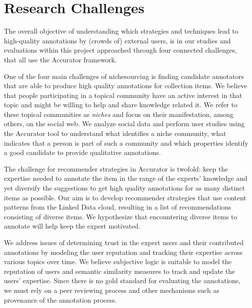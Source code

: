 \section{Research Challenges}
\label{use_case}

The overall objective of understanding which strategies and techniques lead to high-quality annotations by (crowds of) external users, is in our studies and evaluations within this project approached through four connected challenges, that all use the Accurator framework.

One of the four main challenges of nichesourcing is finding candidate annotators that are able to produce high quality annotations for collection items. 
We believe that people participating in a topical community have an active interest in that topic and might be willing to help and share knowledge related it. We refer to these topical communities as \textit{niches} and focus on their manifestation, among others, on the social web. We analyze social data and perform user studies using the Accurator tool to understand what identifies a niche community, what indicates that a person is part of such a community and which properties identify a good candidate to provide qualitative annotations. 

The challenge for recommender strategies in Accurator is twofold: keep the expertise needed to annotate the item in the range of the experts' knowledge and yet diversify the suggestions to get high quality annotations for as many distinct items as possible. 
Our aim is to develop recommender strategies that use content patterns from the Linked Data cloud, resulting in a list of recommendations consisting of diverse items. 
We hypothesize that encountering diverse items to annotate will help keep the expert motivated.

We address issues of determining trust in the expert users and their contributed annotations by modeling the user reputation and tracking their expertise across various topics over time. We believe subjective logic is suitable to model the reputation of users and semantic similarity measures to track and update the users' expertise. Since there is no gold standard for evaluating the annotations, we must rely on a peer reviewing process and other mechanisms such as provenance of the annotation process.

